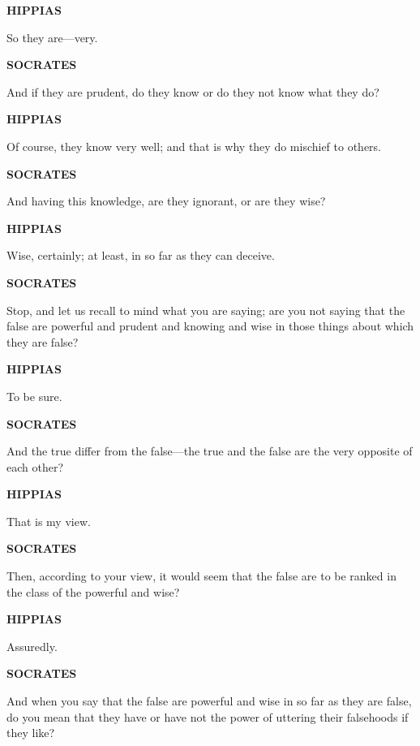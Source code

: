 \documentclass[11pt,letter]{article}
\begin{document}
\par \textbf{HIPPIAS}
\par   So they are—very.

\par \textbf{SOCRATES}
\par   And if they are prudent, do they know or do they not know what they do?

\par \textbf{HIPPIAS}
\par   Of course, they know very well; and that is why they do mischief to others.

\par \textbf{SOCRATES}
\par   And having this knowledge, are they ignorant, or are they wise?

\par \textbf{HIPPIAS}
\par   Wise, certainly; at least, in so far as they can deceive.

\par \textbf{SOCRATES}
\par   Stop, and let us recall to mind what you are saying; are you not saying that the false are powerful and prudent and knowing and wise in those things about which they are false?

\par \textbf{HIPPIAS}
\par   To be sure.

\par \textbf{SOCRATES}
\par   And the true differ from the false—the true and the false are the very opposite of each other?

\par \textbf{HIPPIAS}
\par   That is my view.

\par \textbf{SOCRATES}
\par   Then, according to your view, it would seem that the false are to be ranked in the class of the powerful and wise?

\par \textbf{HIPPIAS}
\par   Assuredly.

\par \textbf{SOCRATES}
\par   And when you say that the false are powerful and wise in so far as they are false, do you mean that they have or have not the power of uttering their falsehoods if they like?
\end{document}
